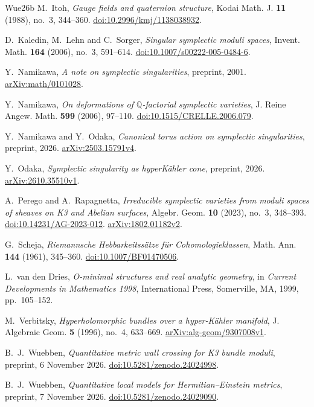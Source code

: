 \begin{thebibliography}{Wue26b}
M.~Itoh, \emph{Gauge fields and quaternion structure},
Kodai Math. J. \textbf{11} (1988), no.~3, 344--360.
\href{https://doi.org/10.2996/kmj/1138038932}{doi:10.2996/kmj/1138038932}.

D.~Kaledin, M.~Lehn and C.~Sorger,
\emph{Singular symplectic moduli spaces},
Invent. Math. \textbf{164} (2006), no.~3, 591--614.
\href{https://doi.org/10.1007/s00222-005-0484-6}{doi:10.1007/s00222-005-0484-6}.

Y.~Namikawa, \emph{A note on symplectic singularities},
preprint, 2001.
\href{https://arxiv.org/abs/math/0101028}{arXiv:math/0101028}.

Y.~Namikawa, \emph{On deformations of $\mathbb Q$-factorial
symplectic varieties}, J. Reine Angew. Math. \textbf{599} (2006), 97--110.
\href{https://doi.org/10.1515/CRELLE.2006.079}{doi:10.1515/CRELLE.2006.079}.

Y.~Namikawa and Y.~Odaka,
\emph{Canonical torus action on symplectic singularities},
preprint, 2026.
\href{https://arxiv.org/abs/2503.15791v4}{arXiv:2503.15791v4}.

Y.~Odaka, \emph{Symplectic singularity as hyperK\"ahler cone},
preprint, 2026.
\href{https://arxiv.org/abs/2610.35510v1}{arXiv:2610.35510v1}.

A.~Perego and A.~Rapagnetta,
\emph{Irreducible symplectic varieties from moduli spaces of sheaves
on K3 and Abelian surfaces}, Algebr. Geom. \textbf{10} (2023),
no.~3, 348--393.
\href{https://doi.org/10.14231/AG-2023-012}{doi:10.14231/AG-2023-012}.
\href{https://arxiv.org/abs/1802.01182v2}{arXiv:1802.01182v2}.

G.~Scheja, \emph{Riemannsche Hebbarkeitss\"atze f\"ur
Cohomologieklassen}, Math. Ann. \textbf{144} (1961), 345--360.
\href{https://doi.org/10.1007/BF01470506}{doi:10.1007/BF01470506}.

L.~van den Dries, \emph{O-minimal structures and real analytic geometry},
in \emph{Current Developments in Mathematics 1998},
International Press, Somerville, MA, 1999, pp.~105--152.

M.~Verbitsky, \emph{Hyperholomorphic bundles over a hyper-K\"ahler
manifold}, J. Algebraic Geom. \textbf{5} (1996), no.~4, 633--669.
\href{https://arxiv.org/abs/alg-geom/9307008v1}{arXiv:alg-geom/9307008v1}.

B.~J.~Wuebben, \emph{Quantitative metric wall crossing for K3 bundle
moduli}, preprint, 6 November 2026.
\href{https://doi.org/10.5281/zenodo.24024998}{doi:10.5281/zenodo.24024998}.

B.~J.~Wuebben, \emph{Quantitative local models for Hermitian--Einstein
metrics}, preprint, 7 November 2026.
\href{https://doi.org/10.5281/zenodo.24029090}{doi:10.5281/zenodo.24029090}.

\end{thebibliography}
